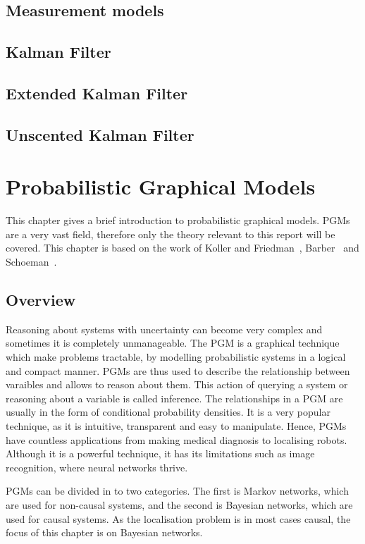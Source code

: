 \documentclass[12pt,oneside,openany,a4paper, %
afrikaans,english,
]{memoir}
\numberwithin{equation}{chapter}
\begin{document}
\section{Measurement models}
\section{Kalman Filter}
\section{Extended Kalman Filter}
\section{Unscented Kalman Filter}
\chapter{Probabilistic Graphical Models}
This chapter gives a brief introduction to probabilistic graphical models. PGMs are a very vast field, therefore only the theory relevant to this report will be covered. This chapter is based on the work of Koller and Friedman~\cite{koller}, Barber~\cite{barber} and Schoeman~\citep{JC}.
\section{Overview}
Reasoning about systems with uncertainty can become very complex and sometimes it is completely unmanageable. The PGM is a graphical technique which make problems tractable, by modelling probabilistic systems in a logical and compact manner. PGMs are thus used to describe the relationship between varaibles and allows to reason about them. This action of querying a system or reasoning about a variable is called inference. The relationships in a PGM are usually in the form of conditional probability densities. It is a very popular technique, as it is intuitive, transparent and easy to manipulate. Hence, PGMs have countless applications from making medical diagnosis to localising robots. Although it is a powerful technique, it has its limitations such as image recognition, where neural networks thrive.

PGMs can be divided in to two categories. The first is Markov networks, which are used for non-causal systems, and the second is Bayesian networks, which are used for causal systems. As the localisation problem is in most cases causal, the focus of this chapter is on Bayesian networks.
\end{document}
